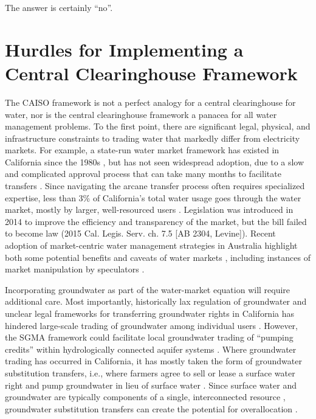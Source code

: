 \noindent The answer is certainly “no”.

\section{Hurdles for Implementing a Central Clearinghouse Framework}

The CAISO framework is not a perfect analogy for a central clearinghouse for water, nor is the central clearinghouse framework a panacea for all water management problems. To the first point, there are significant legal, physical, and infrastructure constraints to trading water that markedly differ from electricity markets. For example, a state-run water market framework has existed in California since the 1980s \citep{ca_dept._of_water_resources_guide_1989}, but has not seen widespread adoption, due to a slow and complicated approval process that can take many months to facilitate transfers \citep{hanak_californias_2012}. Since navigating the arcane transfer process often requires specialized expertise, less than 3\% of California’s total water usage goes through the water market, mostly by larger, well-resourced users \citep{hanak_californias_2012}. Legislation was introduced in 2014 to improve the efficiency and transparency of the market, but the bill failed to become law (2015 Cal. Legis. Serv. ch. 7.5 [AB 2304, Levine]). Recent adoption of market-centric water management strategies in Australia highlight both some potential benefits and caveats of water markets \citep{skurray_hydrological_2012,wheeler_reviewing_2014,grafton_comparative_2012}, including instances of market manipulation by speculators \citep{chris_mclennan_water_2016}.

Incorporating groundwater as part of the water-market equation will require additional care. Most importantly, historically lax regulation of groundwater and unclear legal frameworks for transferring groundwater rights in California has hindered large-scale trading of groundwater among individual users \citep{green_nylen_trading_2017}. However, the SGMA framework could facilitate local groundwater trading of “pumping credits” within hydrologically connected aquifer systems \citep{green_nylen_trading_2017,ellen_m._bruno_gains_2018}. Where groundwater trading has occurred in California, it has mostly taken the form of groundwater substitution transfers, i.e., where farmers agree to sell or lease a surface water right and pump groundwater in lieu of surface water \citep{scharf_californias_2016}. Since surface water and groundwater are typically components of a single, interconnected resource \citep{winter_ground_1998}, groundwater substitution transfers can create the potential for overallocation \citep{scharf_californias_2016}.

